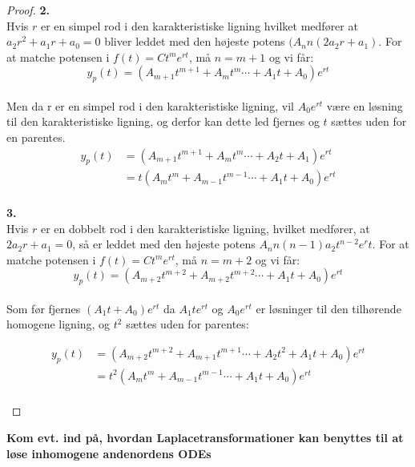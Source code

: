 \begin{proof}
\textbf{2.} \\
Hvis $r$ er en simpel rod i den karakteristiske ligning hvilket medfører at $a_2r^2+a_1r+a_0=0$ bliver leddet med den højeste potens $(A_nn(2a_2r+a_1)$. For at matche potensen i $f(t)=Ct^me^{rt}$, må $n=m+1$ og vi får: \\
\begin{equation*}
y_p(t)= (A_{m+1}t^{m+1}+A_{m}t^{m}  \cdots +A_1t+A_0)e^{rt}
\end{equation*} \\
Men da r  er en simpel rod i den karakteristiske ligning, vil $A_0e^{rt}$ være  en løsning til den karakteristiske ligning, og derfor kan dette led fjernes og $t$ sættes uden for en parentes. \\
\begin{align*}
y_p(t)&= (A_{m+1}t^{m+1}+A_{m}t^{m}  \cdots+ A_2t +A_1)e^{rt} \\
      &= t(A_{m}t^{m}+A_{m-1}t^{m-1}  \cdots +A_1t+A_0)e^{rt}
\end{align*} \\

\textbf{3.}\\
Hvis $r$ er en dobbelt rod i den karakteristiske ligning, hvilket medfører, at $2a_2r+a_1=0$, så er leddet med den højeste potens $A_nn(n-1)a_2t^{n-2}e^rt$. For at matche potensen i $f(t)=Ct^me^{rt}$, må $n=m+2$ og vi får: \\

\begin{equation*}
y_p(t)= (A_{m+2}t^{m+2}+A_{m+2}t^{m+2}  \cdots +A_1t+A_0)e^{rt}
\end{equation*} \\
Som før fjernes $(A_1t+A_0)e^{rt}$ da $A_1te^{rt}$ og $A_0e^{rt}$ er løsninger til den tilhørende homogene ligning, og $t^2$ sættes uden for parentes: 

\begin{align*}
y_p(t)&= (A_{m+2}t^{m+2}+A_{m+1}t^{m+1}  \cdots+ A_2t^2+A_1t+A_0)e^{rt} \\
      &= t^2(A_{m}t^{m}+A_{m-1}t^{m-1}  \cdots +A_1t+A_0)e^{rt}
\end{align*} \\

\end{proof}

\textbf{Kom evt. ind på, hvordan Laplacetransformationer kan benyttes til at løse inhomogene andenordens ODEs}
